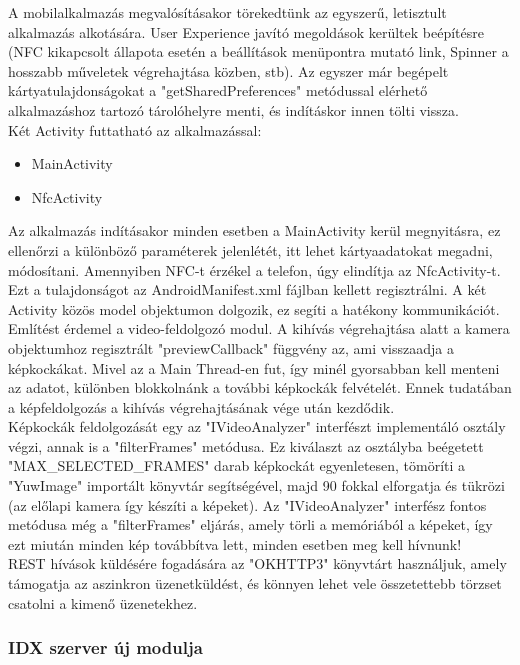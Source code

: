 A mobilalkalmazás megvalósításakor törekedtünk az egyszerű, letisztult alkalmazás alkotására.
User Experience javító megoldások kerültek beépítésre (NFC kikapcsolt állapota esetén a beállítások menüpontra mutató link, Spinner a hosszabb műveletek végrehajtása közben, stb). Az egyszer már begépelt kártyatulajdonságokat a "getSharedPreferences" metódussal elérhető alkalmazáshoz tartozó tárolóhelyre menti, és indításkor innen tölti vissza.
\\Két Activity futtatható az alkalmazással:
\begin{itemize}
\item MainActivity
\item NfcActivity
\end{itemize}

Az alkalmazás indításakor minden esetben a MainActivity kerül megnyitásra, ez ellenőrzi a különböző paraméterek jelenlétét, itt lehet kártyaadatokat megadni, módosítani. Amennyiben NFC-t érzékel a telefon, úgy elindítja az NfcActivity-t. Ezt a tulajdonságot az AndroidManifest.xml fájlban kellett regisztrálni. A két Activity közös model objektumon dolgozik, ez segíti a hatékony kommunikációt.
\\Említést érdemel a video-feldolgozó modul. A kihívás végrehajtása alatt a kamera objektumhoz regisztrált "previewCallback" függvény az, ami visszaadja a képkockákat. Mivel az a Main Thread-en fut, így minél gyorsabban kell menteni az adatot, különben blokkolnánk a további képkockák felvételét. Ennek tudatában a képfeldolgozás a kihívás végrehajtásának vége után kezdődik.\\
Képkockák feldolgozását egy az "IVideoAnalyzer" interfészt implementáló osztály végzi, annak is a "filterFrames" metódusa. Ez kiválaszt az osztályba beégetett "MAX\_SELECTED\_FRAMES" darab képkockát egyenletesen, tömöríti a "YuwImage" importált könyvtár segítségével, majd 90 fokkal elforgatja és tükrözi (az előlapi kamera így készíti a képeket). Az "IVideoAnalyzer" interfész fontos metódusa még a "filterFrames" eljárás, amely törli a memóriából a képeket, így ezt miután minden kép továbbítva lett, minden esetben meg kell hívnunk!
\\REST hívások küldésére fogadására az "OKHTTP3" könyvtárt használjuk, amely támogatja az aszinkron üzenetküldést, és könnyen lehet vele összetettebb törzset csatolni a kimenő üzenetekhez.

\subsubsection{IDX szerver új modulja}

